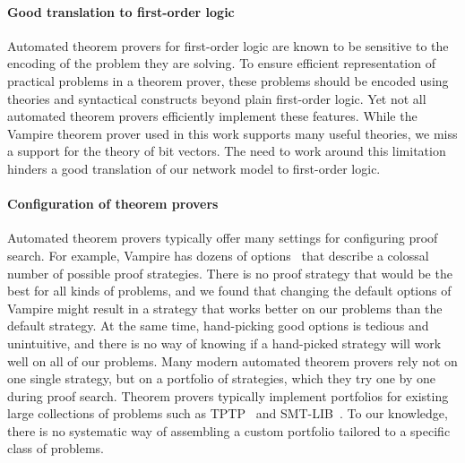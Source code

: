 \paragraph{Good translation to first-order logic}
Automated theorem provers for first-order logic are known to be sensitive to the encoding of the problem they are solving. To ensure efficient representation of practical problems in a theorem prover, these problems should be encoded using theories and syntactical constructs beyond plain first-order logic. Yet not all automated theorem provers efficiently implement these features. While the Vampire theorem prover used in this work supports many useful theories, we miss a support for the theory of bit vectors. The need to work around this limitation hinders a good translation of our network model to first-order logic. %


\paragraph{Configuration of theorem provers}
Automated theorem provers typically offer many settings for configuring proof search. For example, Vampire has dozens of options~\cite{DBLP:conf/cade/Reger0V14} that describe a colossal number of possible proof strategies. There is no proof strategy that would be the best for all kinds of problems, and we found that changing the default options of Vampire might result in a strategy that works better on our problems than the default strategy. At the same time, hand-picking good options is tedious and unintuitive, and there is no way of knowing if a hand-picked strategy will work well on all of our problems. Many modern automated theorem provers rely not on one single strategy, but on a portfolio of strategies, which they try one by one during proof search. Theorem provers typically implement portfolios for existing large collections of problems such as TPTP~\cite{TPTP} and SMT-LIB~\cite{SMT-LIB}. To our knowledge, there is no systematic way of assembling a custom portfolio tailored to a specific class of problems.


